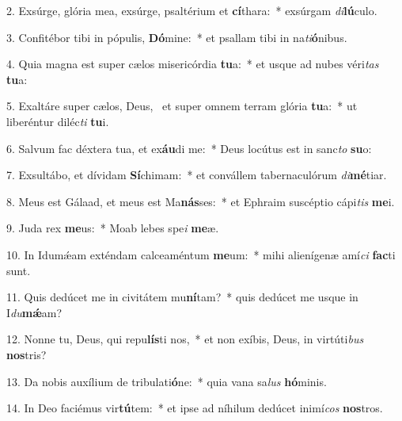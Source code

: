 2. Exsúrge, glória mea, exsúrge, psaltérium et \textbf{cí}thara:~*  exsúrgam \textit{di}\textbf{lú}culo.\

3. Confitébor tibi in pópulis, \textbf{Dó}mine:~*  et psallam tibi in na\textit{ti}\textbf{ó}nibus.\

4. Quia magna est super cælos misericórdia \textbf{tu}a:~*  et usque ad nubes véri\textit{tas} \textbf{tu}a:\

5. Exaltáre super cælos, Deus, \dag\  et super omnem terram glória \textbf{tu}a:~*  ut liberéntur diléc\textit{ti} \textbf{tu}i.\

6. Salvum fac déxtera tua, et ex\textbf{áu}di me:~*  Deus locútus est in sanc\textit{to} \textbf{su}o:\

7. Exsultábo, et dívidam \textbf{Sí}chimam:~*  et convállem tabernaculórum \textit{di}\textbf{mé}tiar.\

8. Meus est Gálaad, et meus est Ma\textbf{nás}ses:~*  et Ephraim suscéptio cápi\textit{tis} \textbf{me}i.\

9. Juda rex \textbf{me}us:~*  Moab lebes spe\textit{i} \textbf{me}æ.\

10. In Idumǽam exténdam calceaméntum \textbf{me}um:~*  mihi alienígenæ amí\textit{ci} \textbf{fac}ti sunt.\

11. Quis dedúcet me in civitátem mu\textbf{ní}tam?~*  quis dedúcet me usque in I\textit{du}\textbf{mǽ}am?\

12. Nonne tu, Deus, qui repu\textbf{lís}ti nos,~*  et non exíbis, Deus, in virtúti\textit{bus} \textbf{nos}tris?\

13. Da nobis auxílium de tribulati\textbf{ó}ne:~*  quia vana sa\textit{lus} \textbf{hó}minis.\

14. In Deo faciémus vir\textbf{tú}tem:~*  et ipse ad níhilum dedúcet inimí\textit{cos} \textbf{nos}tros.\


